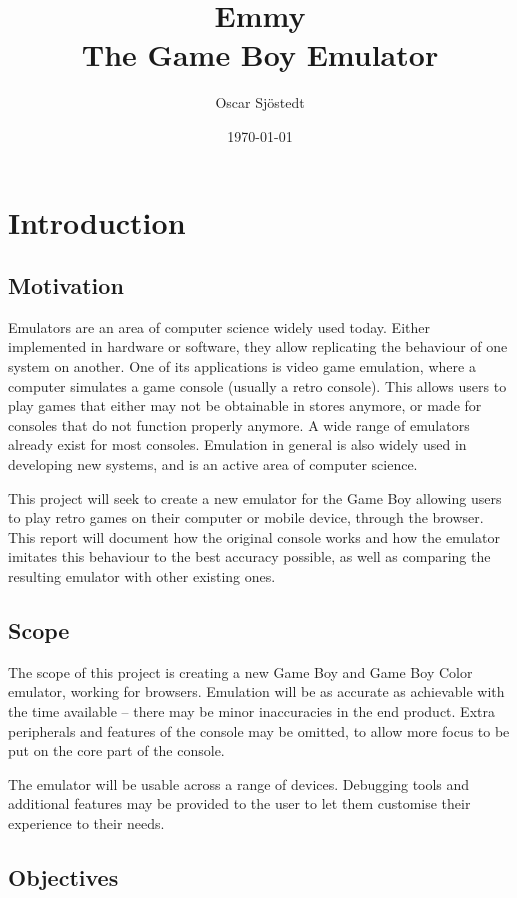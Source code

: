 \documentclass[11pt]{informatics-report}
\title{Emmy \\\vspace{0.2cm}The Game Boy Emulator}
\author{Oscar Sjöstedt}
\date{\today}
\begin{document}
\createFrontMatter

\onehalfspacing

{\hypersetup{hidelinks}\tableofcontents}

\doublespacing

\chapter{Introduction}

\section{Motivation}

Emulators are an area of computer science widely used today. Either implemented in hardware or software, they allow replicating the behaviour of one system on another. One of its applications is video game emulation, where a computer simulates a game console (usually a retro console). This allows users to play games that either may not be obtainable in stores anymore, or made for consoles that do not function properly anymore. A wide range of emulators already exist for most consoles. Emulation in general is also widely used in developing new systems, and is an active area of computer science.

This project will seek to create a new emulator for the Game Boy allowing users to play retro games on their computer or mobile device, through the browser. This report will document how the original console works and how the emulator imitates this behaviour to the best accuracy possible, as well as comparing the resulting emulator with other existing ones.

\section{Scope}

The scope of this project is creating a new Game Boy and Game Boy Color emulator, working for browsers. Emulation will be as accurate as achievable with the time available -- there may be minor inaccuracies in the end product. Extra peripherals and features of the console may be omitted, to allow more focus to be put on the core part of the console.

The emulator will be usable across a range of devices. Debugging tools and additional features may be provided to the user to let them customise their experience to their needs.

\section{Objectives}
\end{document}
